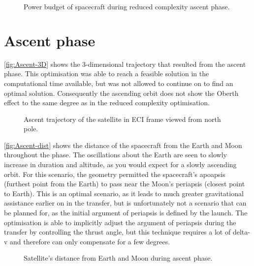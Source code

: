 \begin{figure}
\centering
\def\svgwidth{\figurewidth}

\caption{Power budget of spacecraft during reduced complexity ascent phase.} \label{fig:Ascent2-energy}
\end{figure}


\clearpage


\section{Ascent phase} \label{sec:Ascent}

\autoref{fig:Ascent-3D} shows the 3-dimensional trajectory that resulted from the ascent phase. This optimisation was able to reach a feasible solution in the computational time available, but was not allowed to continue on to find an optimal solution. Consequently the ascending orbit does not show the Oberth effect to the same degree as in the reduced complexity optimisation.

\begin{figure}[h]
\centering
\def\svgwidth{\figurewidth}

\caption{Ascent trajectory of the satellite in ECI frame viewed from north pole.} \label{fig:Ascent-3D}
\end{figure}

\autoref{fig:Ascent-dist} shows the distance of the spacecraft from the Earth and Moon throughout the phase. The oscillations about the Earth are seen to slowly increase in duration and altitude, as you would expect for a slowly ascending orbit. For this scenario, the geometry permitted the spacecraft's apoapsis (furthest point from the Earth) to pass near the Moon's periapsis (closest point to Earth). This is an optimal scenario, as it leads to much greater gravitational assistance earlier on in the transfer, but is unfortunately not a scenario that can be planned for, as the initial argument of periapsis is defined by the launch. The optimisation is able to implicitly adjust the argument of periapsis during the transfer by controlling the thrust angle, but this technique requires a lot of delta-v and therefore can only compensate for a few degrees.

\begin{figure}
\centering
\def\svgwidth{\figurewidth}

\caption{Satellite's distance from Earth and Moon during ascent phase.} \label{fig:Ascent-dist}
\end{figure}

